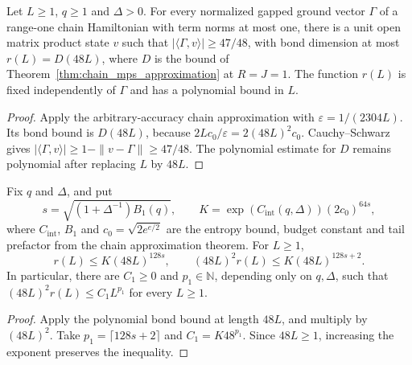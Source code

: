 \begin{lemma}
    \label{lem:lvv_bond_trimming_reference}
    \leanok
    Let $L\ge1$, $q\ge1$ and $\Delta>0$. For every normalized gapped ground
    vector $\Gamma$ of a range-one chain Hamiltonian with term norms at
    most one, there is a unit open matrix product state $v$ such that
    $|\langle\Gamma,v\rangle|\ge47/48$, with bond dimension at most
    $r(L)=D(48L)$, where $D$ is the bound of
    Theorem~\ref{thm:chain_mps_approximation} at $R=J=1$.
    The function $r(L)$ is fixed independently of $\Gamma$ and has a
    polynomial bound in $L$.
\end{lemma}
\begin{proof}
    \leanok
    Apply the arbitrary-accuracy chain approximation with
    $\varepsilon=1/(2304L)$. Its bond bound is $D(48L)$, because
    $2Lc_0/\varepsilon=2(48L)^2c_0$. Cauchy--Schwarz gives
    $|\langle\Gamma,v\rangle|\ge1-\|v-\Gamma\|\ge47/48$.
    The polynomial estimate for $D$ remains polynomial after replacing
    $L$ by $48L$.
\end{proof}

\begin{lemma}
    \label{lem:lvv_bond_trimming_radius_polynomial}
    \leanok
    Fix $q$ and $\Delta$, and put
    \[
        s=\sqrt{(1+\Delta^{-1})B_1(q)},\qquad
        K=\exp(C_{\mathrm{int}}(q,\Delta))(2c_0)^{64s},
    \]
    where $C_{\mathrm{int}}$, $B_1$ and $c_0=\sqrt{2e^{e/2}}$ are the
    entropy bound, budget constant and tail prefactor from the chain
    approximation theorem. For $L\ge1$,
    \[
        r(L)\le K(48L)^{128s},\qquad
        (48L)^2r(L)\le K(48L)^{128s+2}.
    \]
    In particular, there are $C_1\ge0$ and $p_1\in\mathbb N$, depending
    only on $q,\Delta$, such that $(48L)^2r(L)\le C_1L^{p_1}$ for
    every $L\ge1$.
\end{lemma}
\begin{proof}
    \leanok
    Apply the polynomial bond bound at length $48L$, and multiply by
    $(48L)^2$. Take $p_1=\lceil128s+2\rceil$ and $C_1=K48^{p_1}$.
    Since $48L\ge1$, increasing the exponent preserves the inequality.
\end{proof}

